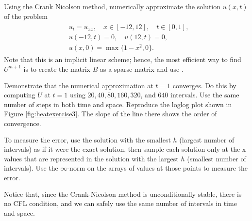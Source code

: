 \begin{problem}
\label{prob:heat_exercise3}
Using the Crank Nicolson method, numerically approximate the solution $u(x,t)$ of the problem
\begin{align}
	\begin{split}
	&{ } u_t = u_{xx}, \quad x \in [-12,12],\quad t \in [0,1],\\
	&{ } u(-12,t) = 0,\quad u(12,t) = 0,\\
	&{ } u(x,0) = \max\{1 - x^2,0\}.
	\end{split}
\end{align}
Note that this is an implicit linear scheme; hence, the most efficient way to find \(U^{m+1}\) is to create the matrix \(B\) as a sparse matrix and use .

Demonstrate that the numerical approximation at $t = 1$ converges.
Do this by computing $U$ at $t=1$ using $20,40,80,160,320$, and $640$ intervals.
Use the same number of steps in both time and space.
Reproduce the loglog plot shown in Figure \ref{fig:heatexercise3}.
The slope of the line there shows the order of convergence.

To measure the error, use the solution with the smallest $h$ (largest number of intervals) as if it were the exact solution, then sample each solution only at the x-values that are represented in the solution with the largest $h$ (smallest number of intervals).
Use the $\infty$-norm on the arrays of values at those points to measure the error.

Notice that, since the Crank-Nicolson method is unconditionally stable, there is no CFL condition, and we can safely use the same number of intervals in time and space.
\end{problem}